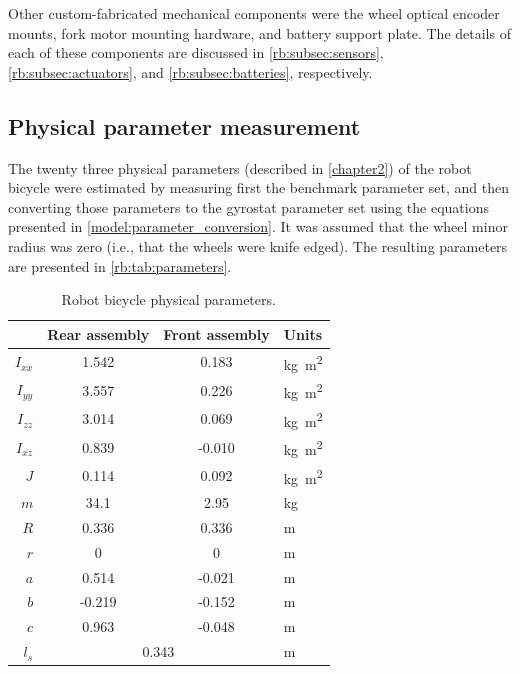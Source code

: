 Other custom-fabricated mechanical components were the wheel optical encoder
mounts, fork motor mounting hardware, and battery support plate. The details of
each of these components are discussed in \ref{rb:subsec:sensors},
\ref{rb:subsec:actuators}, and \ref{rb:subsec:batteries}, respectively.

\subsection{Physical parameter measurement} \label{rb:subsec:parameters}
The twenty three physical parameters (described in \autoref{chapter2}) of the
robot bicycle were estimated by measuring first the benchmark parameter set,
and then converting those parameters to the gyrostat parameter set using the
equations presented in \autoref{model:parameter_conversion}. It was assumed
that the wheel minor radius was zero (i.e., that the wheels were knife edged).
The resulting parameters are presented in \autoref{rb:tab:parameters}.

\begin{table}[ht]
  \centering
  \begin{tabular}{rccl}
    \toprule
    & {Rear assembly} & {Front assembly} & {Units} \\
    \midrule
    $I_{xx}$ &  1.542 &   0.183 & \si{kg.m^2} \\
    $I_{yy}$ &  3.557 &   0.226 & \si{kg.m^2} \\
    $I_{zz}$ &  3.014 &   0.069 & \si{kg.m^2} \\
    $I_{xz}$ &  0.839 &  -0.010 & \si{kg.m^2} \\
         $J$ &  0.114 &   0.092 & \si{kg.m^2} \\
         $m$ & 34.1   &   2.95  & \si{kg}     \\
         $R$ &  0.336 &   0.336 & \si{m}      \\
         $r$ &  0     &   0     & \si{m}\\
         $a$ &  0.514 &  -0.021 & \si{m}\\
         $b$ & -0.219 &  -0.152 & \si{m}\\
         $c$ &  0.963 &  -0.048 & \si{m}\\
         $l_s$ & \multicolumn{2}{c}{0.343} &  \si{m} \\
    \bottomrule
  \end{tabular}
  \caption{Robot bicycle physical parameters.}
  \label{rb:tab:parameters}
\end{table}

